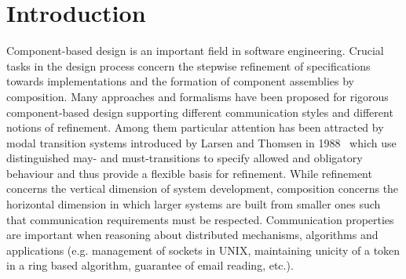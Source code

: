 


\section{Introduction}

%


Component-based design is an important field in software engineering.
Crucial tasks in the design process concern the stepwise refinement of specifications
towards implementations and the
formation of component assemblies by composition.
Many approaches and formalisms have been proposed for rigorous
component-based design  supporting different communication styles
and different notions of refinement.
Among them particular attention has been attracted by modal transition systems
introduced by Larsen and Thomsen in 1988~\cite{DBLP:conf/lics/LarsenT88}
which use distinguished may- and must-transitions to specify allowed and
obligatory behaviour and thus provide a flexible basis for refinement.
While refinement concerns the vertical dimension of system development,
composition concerns the horizontal dimension in which larger systems are built from smaller
ones such that communication requirements must be respected.
Communication properties are important when reasoning about distributed
mechanisms, algorithms and applications (e.g. management of sockets in UNIX,
maintaining unicity of a token in a ring based algorithm, guarantee of email reading, etc.).

